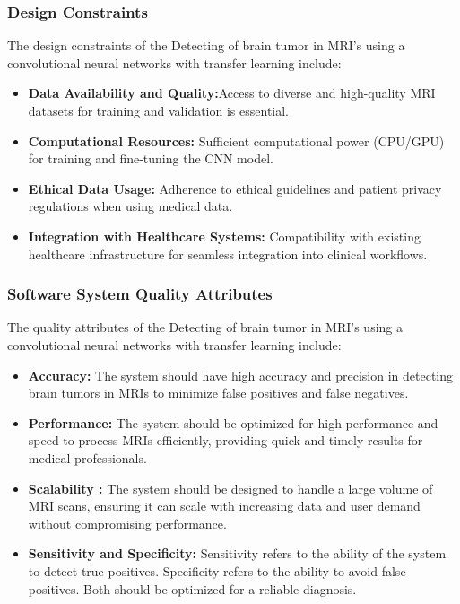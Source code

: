 \subsubsection{Design Constraints}
The design constraints of the Detecting of brain tumor in MRI’s using a convolutional neural networks with transfer
learning include:
\begin{itemize}
    \item \textbf{Data Availability and Quality:}Access to diverse and high-quality MRI datasets for training and validation is essential.
    \item \textbf{Computational Resources:} Sufficient computational power (CPU/GPU) for training and fine-tuning the CNN model.
    \item \textbf{Ethical Data Usage:} Adherence to ethical guidelines and patient privacy regulations when using medical data.
    \item \textbf{Integration with Healthcare Systems:} Compatibility with existing healthcare infrastructure for seamless integration into clinical workflows.
\end{itemize}

\subsubsection{Software System Quality Attributes}
The quality attributes of the Detecting of brain tumor in MRI’s using a convolutional neural networks with transfer
learning  include:
\begin{itemize}
    \item \textbf{Accuracy:} The system should have high accuracy and precision in detecting brain tumors in MRIs to minimize false positives and false negatives.
    \item \textbf{Performance:} The system should be optimized for high performance and speed to process MRIs efficiently, providing quick and timely results for medical professionals.
    \item \textbf{Scalability :} The system should be designed to handle a large volume of MRI scans, ensuring it can scale with increasing data and user demand without compromising performance.
    \item \textbf{Sensitivity and Specificity:} Sensitivity refers to the ability of the system to detect true positives. Specificity refers to the ability to avoid false positives. Both should be optimized for a reliable diagnosis.
\end{itemize}

